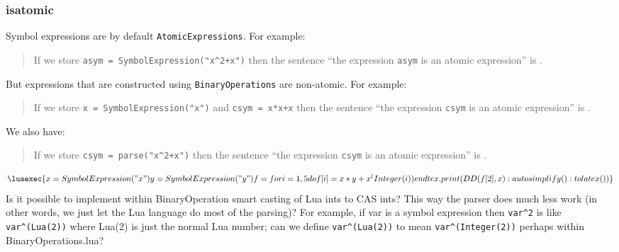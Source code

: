\documentclass{article}
\begin{document}
\subsubsection{isatomic} 
Symbol expressions are by default \verb|AtomicExpressions|. For example: 
\begin{quote} 
If we store \verb|asym = SymbolExpression("x^2+x")| then the sentence ``the expression \verb|asym| is an atomic expression'' is 
.
\end{quote}
But expressions that are constructed using \verb|BinaryOperations| are non-atomic. For example:
\begin{quote}
    If we store \verb|x = SymbolExpression("x")| and \verb|csym = x*x+x| then the sentence ``the expression \verb|csym| is an atomic expression'' is
    .
\end{quote}
We also have:
\begin{quote}
    If we store \verb|csym = parse("x^2+x")| then the sentence ``the expression \verb|csym| is an atomic expression'' is
    .
\end{quote}
\[ \luaexec{
    x = SymbolExpression("x")
    y = SymbolExpression("y")
    f = {}
    for i=1,5 do
        f[i] = x*y+x^(Integer(i))
    end
    tex.print(DD(f[2],x):autosimplify():tolatex())
} \] 
{\color{red} 
    Is it possible to implement within {\ttfamily BinaryOperation} smart casting of Lua ints to CAS ints? This way the parser does much less work (in other words, we just let the Lua language do most of the parsing)? For example, if {\ttfamily var} is a symbol expression then \verb|var^2| is like \verb|var^(Lua(2))| where {\ttfamily Lua(2)} is just the normal Lua number; can we define \verb|var^(Lua(2))| to mean \verb|var^(Integer(2))| perhaps within {\ttfamily BinaryOperations.lua}?}
\begin{comment}
    \begin{CAS}[var='x','y']
        x=Integer('12341234098134509898234324')
        f = x^2+x -- the 2 here is interpreted as Integer(2)
        disp(DD(f,x))
    \end{CAS}
\end{comment}
\end{document}
